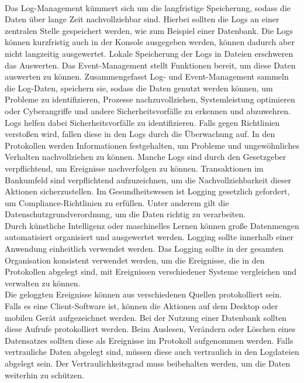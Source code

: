 \\
Das Log-Management kümmert sich um die langfristige Speicherung, sodass die Daten über lange Zeit nachvollziehbar sind.
Hierbei sollten die Logs an einer zentralen Stelle gespeichert werden, wie zum Beispiel einer Datenbank.
Die Logs können kurzfristig auch in der Konsole ausgegeben werden, können dadurch aber nicht langzeitig ausgewertet.
Lokale Speicherung der Logs in Dateien erschweren das Auswerten.
Das Event-Management stellt Funktionen bereit, um diese Daten auswerten zu können.
Zusammengefasst Log- und Event-Management sammeln die Log-Daten, speichern sie, sodass die Daten genutzt werden können, um Probleme zu identifizieren, Prozesse nachzuvollziehen, Systemleistung optimieren oder Cyberangriffe und andere Sicherheitsvorfälle zu erkennen und abzuwehren.
\\
Logs helfen dabei Sicherheitsvorfälle zu identifizieren.
Falls gegen Richtlinien verstoßen wird, fallen diese in den Logs durch die Überwachung auf.
In den Protokollen werden Informationen festgehalten, um Probleme und ungewöhnliches Verhalten nachvollziehen zu können.
Manche Logs sind durch den Gesetzgeber verpflichtend, um Ereignisse nachverfolgen zu können.
Transaktionen im Bankumfeld sind verpflichtend aufzuzeichnen, um die Nachvollziehbarkeit dieser Aktionen sicherzustellen.
Im Gesundheitswesen ist Logging gesetzlich gefordert, um Compliance-Richtlinien zu erfüllen.
Unter anderem gilt die Datenschutzgrundverordnung, um die Daten richtig zu verarbeiten.
\\
Durch künstliche Intelligenz oder maschinelles Lernen können große Datenmengen automatisiert organisiert und ausgewertet werden.
Logging sollte innerhalb einer Anwendung einheitlich verwendet werden.
Das Logging sollte in der gesamten Organisation konsistent verwendet werden, um die Ereignisse, die in den Protokollen abgelegt sind, mit Ereignissen verschiedener Systeme vergleichen und verwalten zu können.
\\
Die geloggten Ereignisse können aus verschiedenen Quellen protokolliert sein.
Falls es eine Client-Software ist, können die Aktionen auf dem Desktop oder mobilen Gerät aufgezeichnet werden.
Bei der Nutzung einer Datenbank sollten diese Aufrufe protokolliert werden.
Beim Auslesen, Verändern oder Löschen eines Datensatzes sollten diese als Ereignisse im Protokoll aufgenommen werden.
Falls vertrauliche Daten abgelegt sind, müssen diese auch vertraulich in den Logdateien abgelegt sein.
Der Vertraulichkeitsgrad muss beibehalten werden, um die Daten weiterhin zu schützen.
\\
